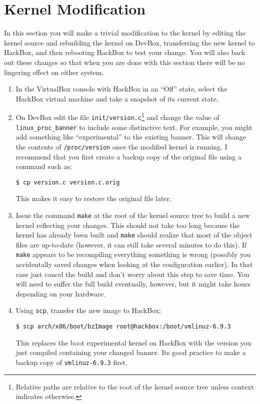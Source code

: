 \documentclass{article}
\newcommand{\command}[1]{\texttt{#1}}
\newcommand{\filename}[1]{\texttt{#1}}
\begin{document}
\section{Kernel Modification}

In this section you will make a trivial modification to the kernel by editing the kernel source
and rebuilding the kernel on DevBox, transferring the new kernel to HackBox, and then rebooting
HackBox to test your change. You will also back out these changes so that when you are done with
this section there will be no lingering effect on either system.

\begin{enumerate}

\item In the VirtualBox console with HackBox in an ``Off'' state, select the HackBox virtual
  machine and take a snapshot of its current state.

\item On DevBox edit the file \filename{init/version.c}\footnote{Relative paths are relative to
    the root of the kernel source tree unless context indicates otherwise.} and change the value
    of \texttt{linux\_proc\_banner} to include some distinctive text. For example, you might add
    something like ``experimental'' to the existing banner. This will change the contents of
    \filename{/proc/version} once the modified kernel is running. I recommend that you first
    create a backup copy of the original file using a command such as:
\begin{verbatim}
$ cp version.c version.c.orig
\end{verbatim}

  This makes it easy to restore the original file later.

\item Issue the command \command{make} at the root of the kernel source tree to build a new
  kernel reflecting your changes. This should not take too long because the kernel has already
  been built and \command{make} should realize that most of the object files are up-to-date
  (however, it can still take several minutes to do this). If \command{make} appears to be
  recompiling everything something is wrong (possibly you accidentally saved changes when
  looking at the configuration earlier). In that case just cancel the build and don't worry
  about this step to save time. You will need to suffer the full build eventually, however, but
  it might take hours depending on your hardware.

\item Using \command{scp}, transfer the new image to HackBox:
\begin{Verbatim}
$ scp arch/x86/boot/bzImage root@hackbox:/boot/vmlinuz-6.9.3
\end{Verbatim}
  This replaces the boot experimental kernel on HackBox with the version you just compiled
  containing your changed banner. Its good practice to make a backup copy of
  \filename{vmlinuz-6.9.3} first.


\end{enumerate}
\end{document}
